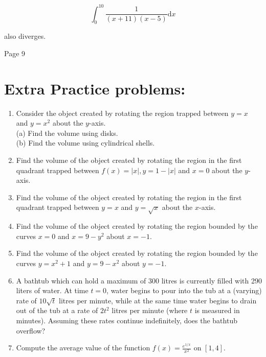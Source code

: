 \documentclass[10pt]{article}
\begin{document}
$$
\int_{0}^{10} \frac{1}{(x+11)(x-5)} \mathrm{d} x
$$

also diverges.

Page 9

\section*{Extra Practice problems:}
\begin{enumerate}
  \item Consider the object created by rotating the region trapped between $y=x$ and $y=x^{2}$ about the $y$-axis.\\
(a) Find the volume using disks.\\
(b) Find the volume using cylindrical shells.
  \item Find the volume of the object created by rotating the region in the first quadrant trapped between $f(x)=|x|, y=1-|x|$ and $x=0$ about the $y$-axis.
  \item Find the volume of the object created by rotating the region in the first quadrant trapped between $y=x$ and $y=\sqrt{x}$ about the $x$-axis.
  \item Find the volume of the object created by rotating the region bounded by the curves $x=0$ and $x=9-y^{2}$ about $x=-1$.
  \item Find the volume of the object created by rotating the region bounded by the curves $y=x^{2}+1$ and $y=9-x^{2}$ about $y=-1$.
  \item A bathtub which can hold a maximum of 300 litres is currently filled with 290 liters of water. At time $t=0$, water begins to pour into the tub at a (varying) rate of $10 \sqrt{t}$ litres per minute, while at the same time water begins to drain out of the tub at a rate of $2 t^{2}$ litres per minute (where $t$ is measured in minutes). Assuming these rates continue indefinitely, does the bathtub overflow?
  \item Compute the average value of the function $f(x)=\frac{e^{1 / x}}{x^{2}}$ on $[1,4]$.
\end{enumerate}
\end{document}
